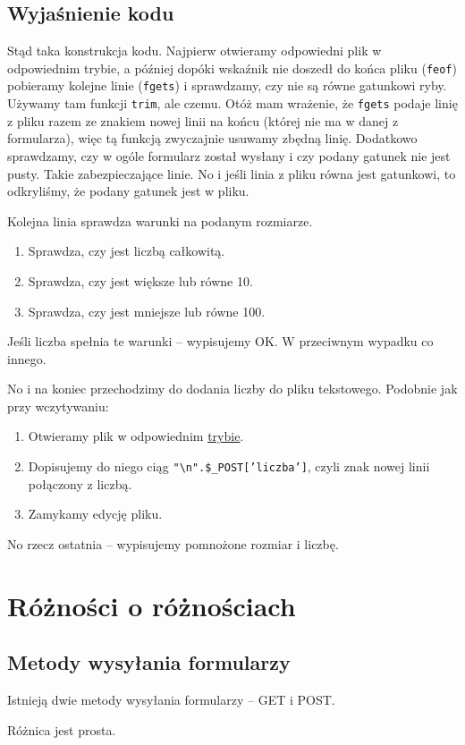 \documentclass [a4paper, 10pt, oneside]{article}
\begin{document}
\subsection{Wyjaśnienie kodu}
Stąd taka konstrukcja kodu. Najpierw otwieramy odpowiedni plik w odpowiednim trybie, a później dopóki wskaźnik nie doszedł do końca pliku (\texttt{feof}) pobieramy kolejne linie (\texttt{fgets}) i sprawdzamy, czy nie są równe gatunkowi ryby. Używamy tam funkcji \texttt{trim}, ale czemu. Otóż mam wrażenie, że \texttt{fgets} podaje linię z pliku razem ze znakiem nowej linii na końcu (której nie ma w danej z formularza), więc tą funkcją zwyczajnie usuwamy zbędną linię. Dodatkowo sprawdzamy, czy w ogóle formularz został wysłany i czy podany gatunek nie jest pusty. Takie zabezpieczające linie. No i jeśli linia z pliku równa jest gatunkowi, to odkryliśmy, że podany gatunek jest w pliku.

Kolejna linia sprawdza warunki na podanym rozmiarze.
\begin{enumerate}
    \item Sprawdza, czy jest liczbą całkowitą.
    \item Sprawdza, czy jest większe lub równe 10.
    \item Sprawdza, czy jest mniejsze lub równe 100.
\end{enumerate}
Jeśli liczba spełnia te warunki -- wypisujemy OK. W przeciwnym wypadku co innego.

No i na koniec przechodzimy do dodania liczby do pliku tekstowego. Podobnie jak przy wczytywaniu:
\begin{enumerate}
    \item Otwieramy plik w odpowiednim \hyperlink{tryby}{trybie}.
    \item Dopisujemy do niego ciąg \texttt{"\textbackslash n".\$\_POST['liczba']}, czyli znak nowej linii połączony z liczbą.
    \item Zamykamy edycję pliku.
\end{enumerate}

No rzecz ostatnia -- wypisujemy pomnożone rozmiar i liczbę.

\section{Różności o różnościach}
\subsection {Metody wysyłania formularzy}
\hypertarget{metody}{Istnieją dwie metody wysyłania formularzy -- GET i POST.} Różnica jest prosta.
\end{document}
